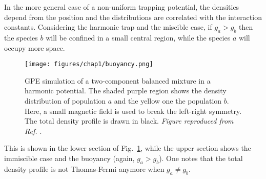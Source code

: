 In the more general case of a non-uniform trapping potential, the densities depend from the position and the distributions are correlated with the interaction constants. Considering the harmonic trap and the miscible case, if $g_a > g_b$ then the species $b$ will be confined in a small central region, while the species $a$ will occupy more space.
\begin{figure}[ht!]
    \centering
    \texttt{[image: figures/chap1/buoyancy.png]}
    \caption{GPE simulation of a two-component balanced mixture in a harmonic potential. The shaded purple region shows the density distribution of population $a$ and the yellow one the population $b$. Here, a small magnetic field is used to break the left-right symmetry. The total density profile is drawn in black. \textit{Figure reproduced from Ref. \cite{lamporesi2023two}}.} 
    \label{fig:buoy}
\end{figure}
This is shown in the lower section of Fig.\ \ref{fig:buoy}, while the upper section shows the immiscible case and the buoyancy (again, $g_a > g_b$). One notes that the total density profile is not Thomas-Fermi anymore when $g_a \neq g_b$.


